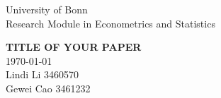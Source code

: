 


\begin{titlepage} %

	
\begin{minipage}{0.4\textwidth} %
    \begin{flushleft} %
    \large
    University of Bonn\\ %
    Research Module in Econometrics and Statistics\\ %
    \end{flushleft}
\end{minipage}
	
\vspace*{2in} %
	
\center %

	
{\huge\bfseries TITLE OF YOUR PAPER}\\[0.4cm] %
{\large\today}\\[0.4cm] %
Lindi Li 3460570 \\
Gewei Cao 3461232 %
	
\vfill %



\vfill %

	

	
\end{titlepage}